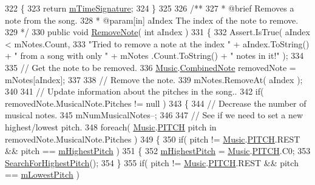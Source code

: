 \begin{DoxyCodeInclude}
322     \{
323         \textcolor{keywordflow}{return} \hyperlink{group___song_priv_var_ga2b2dcc0e83e49f7303b6a1371877b25e}{mTimeSignature};
324     \}
325 \textcolor{comment}{}
326 \textcolor{comment}{    /** }
327 \textcolor{comment}{     * @brief Removes a note from the song.}
328 \textcolor{comment}{     * @param[in] aIndex The index of the note to remove.}
329 \textcolor{comment}{    */}
330     \textcolor{keyword}{public} \textcolor{keywordtype}{void} \hyperlink{group___song_pub_func_ga856634e047b8c35160958c3aa53d6b28}{RemoveNote}( \textcolor{keywordtype}{int} aIndex )
331     \{
332         Assert.IsTrue( aIndex < mNotes.Count,
333             \textcolor{stringliteral}{"Tried to remove a note at the index "} + aIndex.ToString() + \textcolor{stringliteral}{" from a song with only "} + mNotes
      .Count.ToString() + \textcolor{stringliteral}{" notes in it!"} );
334 
335         \textcolor{comment}{// Get the note to be removed.}
336         \hyperlink{class_music}{Music}.\hyperlink{group___music_structs_struct_music_1_1_combined_note}{CombinedNote} removedNote = mNotes[aIndex];
337 
338         \textcolor{comment}{// Remove the note.}
339         mNotes.RemoveAt( aIndex );
340 
341         \textcolor{comment}{// Update information about the pitches in the song..}
342         \textcolor{keywordflow}{if}( removedNote.MusicalNote.Pitches != null )
343         \{
344             \textcolor{comment}{// Decrease the number of musical notes.}
345             mNumMusicalNotes--;
346 
347             \textcolor{comment}{// See if we need to set a new highest/lowest pitch.}
348             \textcolor{keywordflow}{foreach}( \hyperlink{class_music}{Music}.\hyperlink{group___music_enums_ga508f69b199ea518f935486c990edac1d}{PITCH} pitch in removedNote.MusicalNote.Pitches )
349             \{
350                 \textcolor{keywordflow}{if}( pitch != \hyperlink{class_music}{Music}.\hyperlink{group___music_enums_ga508f69b199ea518f935486c990edac1d}{PITCH}.REST && pitch == 
      \hyperlink{group___song_priv_var_ga2dcd39d9add609e9df56a94057441dcc}{mHighestPitch} )
351                 \{
352                     \hyperlink{group___song_priv_var_ga2dcd39d9add609e9df56a94057441dcc}{mHighestPitch} = \hyperlink{class_music}{Music}.\hyperlink{group___music_enums_ga508f69b199ea518f935486c990edac1d}{PITCH}.C0;
353                     \hyperlink{group___song_priv_func_ga5f837e6b7f576732fa38747caa057621}{SearchForHighestPitch}();
354                 \}
355                 \textcolor{keywordflow}{if}( pitch != \hyperlink{class_music}{Music}.\hyperlink{group___music_enums_ga508f69b199ea518f935486c990edac1d}{PITCH}.REST && pitch == \hyperlink{group___song_priv_var_ga293976ef4c2050687a81edfbf77b4fc1}{mLowestPitch} )

\end{DoxyCodeInclude}
